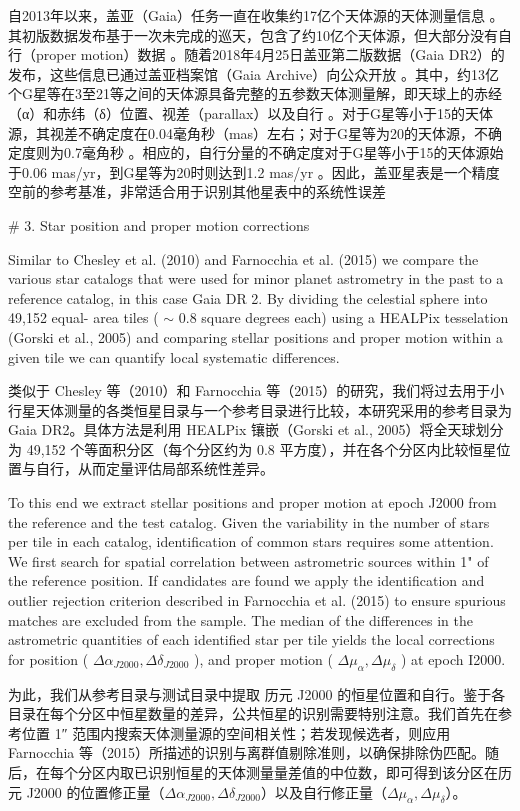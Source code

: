 自2013年以来，盖亚（Gaia）任务一直在收集约17亿个天体源的天体测量信息 。其初版数据发布基于一次未完成的巡天，包含了约10亿个天体源，但大部分没有自行（proper motion）数据 。随着2018年4月25日盖亚第二版数据（Gaia DR2）的发布，这些信息已通过盖亚档案馆（Gaia Archive）向公众开放 。其中，约13亿个G星等在3至21等之间的天体源具备完整的五参数天体测量解，即天球上的赤经（α）和赤纬（δ）位置、视差（parallax）以及自行 。对于G星等小于15的天体源，其视差不确定度在0.04毫角秒（mas）左右；对于G星等为20的天体源，不确定度则为0.7毫角秒 。相应的，自行分量的不确定度对于G星等小于15的天体源始于0.06 mas/yr，到G星等为20时则达到1.2 mas/yr 。因此，盖亚星表是一个精度空前的参考基准，非常适合用于识别其他星表中的系统性误差 

# 3. Star position and proper motion corrections

Similar to Chesley et al. (2010) and Farnocchia et al. (2015) we compare the various star catalogs that were used for minor planet astrometry in the past to a reference catalog, in this case Gaia DR 2. By dividing the celestial sphere into 49,152 equal- area tiles ( $\sim$ 0.8 square degrees each) using a HEALPix tesselation (Gorski et al., 2005) and comparing stellar positions and proper motion within a given tile we can quantify local systematic differences. 

类似于 Chesley 等（2010）和 Farnocchia 等（2015）的研究，我们将过去用于小行星天体测量的各类恒星目录与一个参考目录进行比较，本研究采用的参考目录为 Gaia DR2。具体方法是利用 HEALPix 镶嵌（Gorski et al., 2005）将全天球划分为 49,152 个等面积分区（每个分区约为 0.8 平方度），并在各个分区内比较恒星位置与自行，从而定量评估局部系统性差异。

To this end we extract stellar positions and proper motion at epoch J2000 from the reference and the test catalog. Given the variability in the number of stars per tile in each catalog, identification of common stars requires some attention. We first search for spatial correlation between astrometric sources within 1" of the reference position. If candidates are found we apply the identification and outlier rejection criterion described in Farnocchia et al. (2015) to ensure spurious matches are excluded from the sample. The median of the differences in the astrometric quantities of each identified star per tile yields the local corrections for position ( $\Delta \alpha_{J2000}, \Delta \delta_{J2000}$ ), and proper motion ( $\Delta \mu_{\alpha}, \Delta \mu_{\delta}$ ) at epoch I2000. 

为此，我们从参考目录与测试目录中提取 历元 J2000 的恒星位置和自行。鉴于各目录在每个分区中恒星数量的差异，公共恒星的识别需要特别注意。我们首先在参考位置 1″ 范围内搜索天体测量源的空间相关性；若发现候选者，则应用 Farnocchia 等（2015）所描述的识别与离群值剔除准则，以确保排除伪匹配。随后，在每个分区内取已识别恒星的天体测量量差值的中位数，即可得到该分区在历元 J2000 的位置修正量（$\Delta \alpha_{J2000}, \Delta \delta_{J2000}$）以及自行修正量（$\Delta \mu_{\alpha}, \Delta \mu_{\delta}$）。

